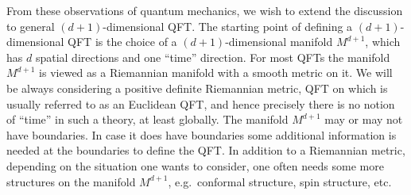 From these observations of quantum mechanics, we wish to extend the
discussion to general $(d+1)$-dimensional QFT. The starting point
of defining a $(d+1)$-dimensional QFT is the choice of a $(d+1)$-dimensional
manifold $M^{d+1}$, which has $d$ spatial directions and one ``time''
direction. For most QFTs the manifold $M^{d+1}$ is viewed as a Riemannian
manifold with a smooth metric on it.
We will be always
considering a positive definite Riemannian metric, QFT on which is usually
referred to as an Euclidean QFT, and hence precisely there is no notion
of ``time'' in such a theory, at least globally. The manifold $M^{d+1}$
may or may not have boundaries. In case it does have boundaries some
additional information is needed at the boundaries to define the QFT.
In addition to a Riemannian metric, depending on the situation one
wants to consider, one often needs some more structures on the manifold
$M^{d+1}$, e.g.~conformal structure, spin structure,
etc. %


